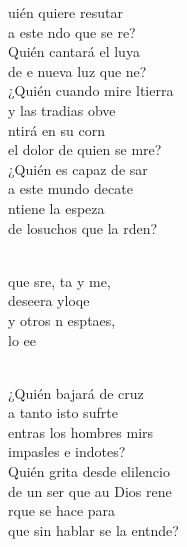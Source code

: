\documentclass[12pt]{article}
\begin{document}
\begin{multicols*}{2}
\begin{cancion}%
	uién quiere resutar \\
	a este ndo que se re?\\
	Quién cantará el luya\\
	de e nueva luz que ne?\\
\jump
	¿Quién cuando mire ltierra \\
	y las tradias obve\\
	ntirá en su corn  \\
	el dolor de quien se mre?\\
\jump
	¿Quién es capaz de sar \\
	a este mundo decate\\
	ntiene la espeza \\
	de losuchos que la rden?\\\jump\\
	\begin{chorus}%
	que sre, ta y me, \\
	deseera yloqe\\
	y otros n esptaes, \\
	lo ee\\
	\end{chorus}%
	\jump\\
	¿Quién bajará de  cruz \\
	a tanto isto sufrte\\
	entras los hombres mirs \\
	impasles e indotes?\\
\jump
	Quién grita desde elilencio \\
	de un ser que au Dios rene\\
	rque se hace para \\
	que sin hablar se la entnde?\\

\end{cancion}
\end{multicols*}
\end{document}
